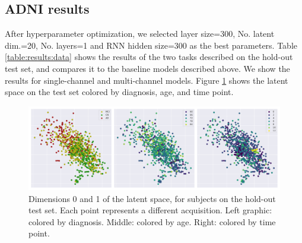 \subsection{ADNI results}

After hyperparameter optimization, we selected layer size=300, No. latent dim.=20, No. layers=1 and RNN hidden size=300 as the best parameters. Table \ref{table:results:data} shows the results of the two tasks described on the hold-out test set, and compares it to the baseline models described above. We show the results for single-channel and multi-channel models. Figure \ref{fig:rnn:latent} shows the latent space on the test set colored by diagnosis, age, and time point. \\

\begin{table}[!htbp]
\centering
{}
\caption[Performance of the model.]{Performance of the models on longitudinal prediction and channel reconstruction, compared to baseline methods. RVAE: single-channel model.  MC-RVAE: multiple channel model. All values are mean absolute error (MAE) over each subject and time point.} \label{table:results:data}
\end{table}


\begin{figure}[!htbp]
  \centering
  \includegraphics[width=1.0\textwidth]{figures/rnnvae/latent_space_fig.png}
  \caption[Latent space for the test set.]{Dimensions 0 and 1 of the latent space, for subjects on the hold-out test set. Each point represents a different acquisition. Left graphic: colored by diagnosis. Middle: colored by age. Right: colored by time point.}\label{fig:rnn:latent}
\end{figure}

